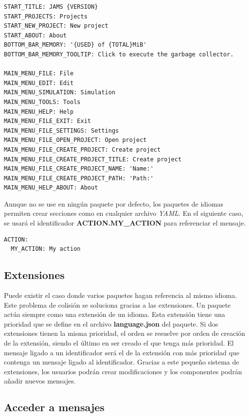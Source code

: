 \begin{lstlisting}[frame=single,label={lst:interface.yml}]
START_TITLE: JAMS {VERSION}
START_PROJECTS: Projects
START_NEW_PROJECT: New project
START_ABOUT: About
BOTTOM_BAR_MEMORY: '{USED} of {TOTAL}MiB'
BOTTOM_BAR_MEMORY_TOOLTIP: Click to execute the garbage collector.

MAIN_MENU_FILE: File
MAIN_MENU_EDIT: Edit
MAIN_MENU_SIMULATION: Simulation
MAIN_MENU_TOOLS: Tools
MAIN_MENU_HELP: Help
MAIN_MENU_FILE_EXIT: Exit
MAIN_MENU_FILE_SETTINGS: Settings
MAIN_MENU_FILE_OPEN_PROJECT: Open project
MAIN_MENU_FILE_CREATE_PROJECT: Create project
MAIN_MENU_FILE_CREATE_PROJECT_TITLE: Create project
MAIN_MENU_FILE_CREATE_PROJECT_NAME: 'Name:'
MAIN_MENU_FILE_CREATE_PROJECT_PATH: 'Path:'
MAIN_MENU_HELP_ABOUT: About
\end{lstlisting}

\noindent Aunque no se use en ningún paquete por defecto,
los paquetes de idiomas permiten crear secciones como
en cualquier archivo \textit{YAML}.
En el siguiente caso, se usará el identificador
\textbf{ACTION.MY\_ACTION} para referenciar el mensaje.

\begin{lstlisting}[frame=single,label={lst:yaml-subsection}]
ACTION:
  MY_ACTION: My action
\end{lstlisting}

\subsection{Extensiones}\label{subsec:idiomas-extensiones}

Puede existir el caso donde varios paquetes hagan referencia al mismo idioma.
Este problema de colisión se soluciona gracias a las extensiones.
Un paquete actúa siempre como una extensión de un idioma.
Esta extensión tiene una prioridad que se define en el archivo
\textbf{language.json} del paquete.
Si dos extensiones tienen la misma prioridad, el orden se resuelve
por orden de creación de la extensión, siendo el último en ser creado
el que tenga más prioridad.
El mensaje ligado a un identificador será el de la extensión con más prioridad
que contenga un mensaje ligado al identificador.
Gracias a este pequeño sistema de extensiones, los usuarios podrán crear modificaciones
y los componentes podrán añadir nuevos mensajes.

\subsection{Acceder a mensajes}\label{subsec:acceder-a-mensajes}

